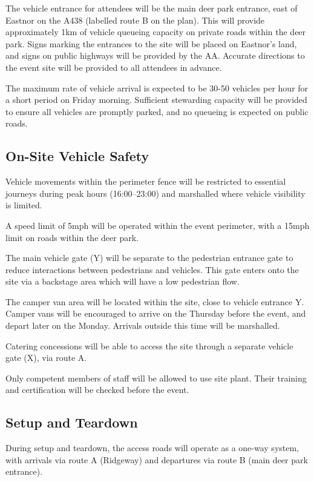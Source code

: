 The vehicle entrance for attendees will be the main deer park entrance, east of
Eastnor on the A438 (labelled route B on the plan). This will provide
approximately 1km of vehicle queueing capacity on private roads within the deer
park. Signs marking the entrances to the site will be placed on Eastnor's land, and
signs on public highways will be provided by the AA\@. Accurate directions to
the event site will be provided to all attendees in advance.

The maximum rate of vehicle arrival is expected to be 30-50 vehicles per hour
for a short period on Friday morning. Sufficient stewarding capacity will be
provided to ensure all vehicles are promptly parked, and no queueing is expected
on public roads.

\subsection{On-Site Vehicle Safety}\label{vehiclesafety}

Vehicle movements within the perimeter fence will be restricted to essential
journeys during peak hours (16:00--23:00) and marshalled where vehicle visibility
is limited.

A speed limit of 5mph will be operated within the event perimeter, with a 15mph
limit on roads within the deer park.

The main vehicle gate (Y) will be separate to the pedestrian entrance gate
to reduce interactions between pedestrians and vehicles. This gate enters
onto the site via a backstage area which will have a low pedestrian flow.

The camper van area will be located within the site, close to vehicle
entrance Y. Camper vans will be encouraged to arrive on the Thursday before
the event, and depart later on the Monday. Arrivals outside this time will be
marshalled.

Catering concessions will be able to access the site through a separate
vehicle gate (X), via route A.

Only competent members of staff will be allowed to use site plant. Their
training and certification will be checked before the event.

\subsection{Setup and Teardown}
During setup and teardown, the access roads will operate as
a one-way system, with arrivals via route A (Ridgeway) and departures via
route B (main deer park entrance).

